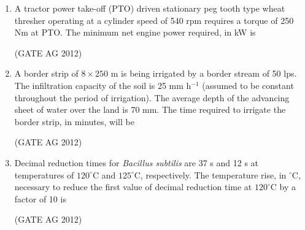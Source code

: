 \documentclass[journal]{IEEEtran}
\begin{document}
\begin{enumerate}
\medskip

\item
 A tractor power take-off (PTO) driven stationary peg tooth type wheat thresher operating at a cylinder speed of 540 rpm requires a torque of 250 Nm at PTO. The minimum net engine power required, in kW is
\begin{enumerate}
\end{enumerate}
\hfill(GATE AG 2012)\\

\medskip

\item
 A border strip of $8 \times 250$ m is being irrigated by a border stream of 50 lps. The infiltration capacity of the soil is 25 mm h$^{-1}$ (assumed to be constant throughout the period of irrigation). The average depth of the advancing sheet of water over the land is 70 mm. The time required to irrigate the border strip, in minutes, will be
\begin{enumerate}
\end{enumerate}
\hfill(GATE AG 2012)\\

\medskip

\item
 Decimal reduction times for \textit{Bacillus subtilis} are 37 s and 12 s at temperatures of $120^\circ$C and $125^\circ$C, respectively. The temperature rise, in $^\circ$C, necessary to reduce the first value of decimal reduction time at $120^\circ$C by a factor of 10 is
\begin{enumerate}
\end{enumerate}
\hfill(GATE AG 2012)\\


\end{enumerate}
\end{document}
